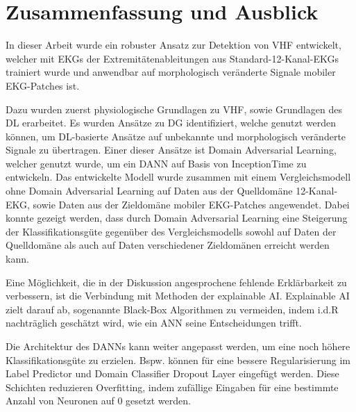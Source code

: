\chapter{Zusammenfassung und Ausblick}\label{chap:fazit}


In dieser Arbeit wurde ein robuster Ansatz zur Detektion von \gls{VHF} entwickelt, welcher mit \gls{EKG}s der Extremitätenableitungen aus Standard-12-Kanal-\gls{EKG}s trainiert wurde und anwendbar auf morphologisch veränderte Signale mobiler \gls{EKG}-Patches ist. 

Dazu wurden zuerst physiologische Grundlagen zu \gls{VHF}, sowie Grundlagen des \gls{DL} erarbeitet. Es wurden Ansätze zu \gls{DG} identifiziert, welche genutzt werden können, um \gls{DL}-basierte Ansätze auf unbekannte und morphologisch veränderte Signale zu übertragen. Einer dieser Ansätze ist Domain Adversarial Learning, welcher genutzt wurde, um ein \gls{DANN} auf Basis von InceptionTime zu entwickeln. Das entwickelte Modell wurde zusammen mit einem Vergleichsmodell ohne Domain Adversarial Learning auf Daten aus der Quelldomäne 12-Kanal-\gls{EKG}, sowie Daten aus der Zieldomäne mobiler \gls{EKG}-Patches angewendet. Dabei konnte gezeigt werden, dass durch Domain Adversarial Learning eine Steigerung der Klassifikationsgüte gegenüber des Vergleichsmodells sowohl auf Daten der Quelldomäne als auch auf Daten verschiedener Zieldomänen erreicht werden kann. 


Eine Möglichkeit, die in der Diskussion angesprochene fehlende Erklärbarkeit zu verbessern, ist die Verbindung mit Methoden der explainable AI. Explainable AI zielt darauf ab, sogenannte Black-Box Algorithmen zu vermeiden, indem i.d.R nachträglich geschätzt wird, wie ein \gls{ANN} seine Entscheidungen trifft. 

Die Architektur des \gls{DANN}s kann weiter angepasst werden, um eine noch höhere  Klassifikationsgüte zu erzielen. Bspw. können für eine bessere Regularisierung im Label Predictor und Domain Classifier Dropout Layer eingefügt werden. Diese Schichten reduzieren Overfitting, indem zufällige Eingaben für eine bestimmte Anzahl von Neuronen auf 0 gesetzt werden. 

